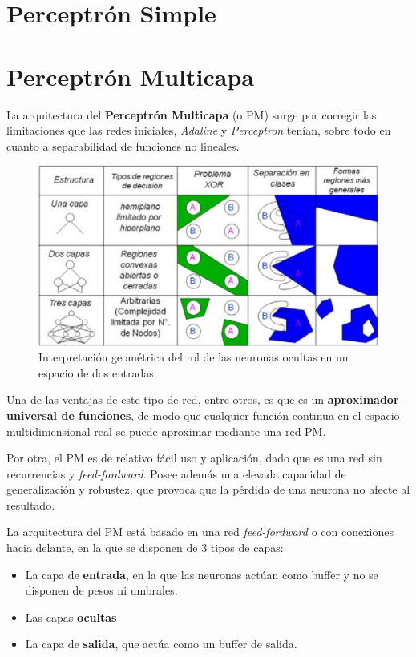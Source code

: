 \documentclass[10pt,a4paper]{article}
\begin{document}
\section{Perceptrón Simple}

\section{Perceptrón Multicapa}

La arquitectura del \textbf{Perceptrón Multicapa} (o PM) surge por corregir las limitaciones que las redes iniciales, \textit{Adaline} y \textit{Perceptron} tenían, sobre todo en cuanto a separabilidad de funciones no lineales.

\begin{figure}
  \label{fig:layers}
  \caption{Interpretación geométrica del rol de las neuronas ocultas en un espacio de dos entradas.}
  \centering
  \hbox{\includegraphics[width=0.65\textwidth-\fboxrule-\fboxrule]{layers.png}}  
\end{figure}	

Una de las ventajas de este tipo de red, entre otros, es que es un \textbf{aproximador universal de funciones}, de modo que cualquier función continua en el espacio multidimensional real se puede aproximar mediante una red PM.

Por otra, el PM es de relativo fácil uso y aplicación, dado que es una red sin recurrencias y \textit{feed-fordward}. Posee además una elevada capacidad de generalización y robustez, que provoca que la pérdida de una neurona no afecte al resultado.

La arquitectura del PM está basado en una red \textit{feed-fordward} o con conexiones hacia delante, en la que se disponen de 3 tipos de capas:
\begin{itemize}
\item La capa de \textbf{entrada}, en la que las neuronas actúan como buffer y no se disponen de pesos ni umbrales.
\item Las capas \textbf{ocultas}
\item La capa de \textbf{salida}, que actúa como un buffer de salida.
\end{itemize}
\end{document}
